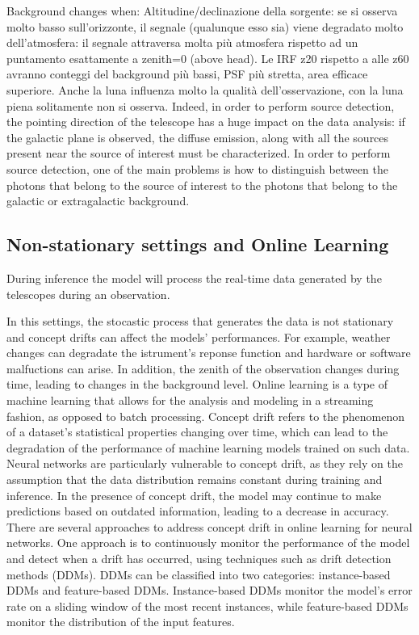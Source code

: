 Background changes when: Altitudine/declinazione della sorgente: se si osserva molto basso sull'orizzonte, il segnale (qualunque esso sia) viene degradato molto dell'atmosfera: il segnale attraversa molta più atmosfera rispetto ad un puntamento esattamente a zenith=0 (above head). Le IRF z20 rispetto a alle z60 avranno conteggi del background più bassi, PSF più stretta, area efficace superiore. Anche la luna influenza molto la qualità dell’osservazione, con la luna piena solitamente non si osserva. 
Indeed, in order to perform source detection, the pointing direction of the telescope has a huge impact on the data analysis: if the galactic plane is observed, the diffuse emission, along with all the sources present near the source of interest must be characterized. 
In order to perform source detection, one of the main problems is how to distinguish between the photons that belong to the source of interest to the photons that belong to the galactic or extragalactic background.



\subsection{Non-stationary settings and Online Learning}
\label{s:non-stationary-settings}
During inference the model will process the real-time data generated by the telescopes during an observation. 

In this settings, the stocastic process that generates the data
is not stationary and concept drifts can affect the models' performances. For example, weather changes can degradate the istrument's reponse function and hardware or software malfuctions can arise. In addition, the zenith of the observation changes during time, leading to changes in the background level.  Online learning is a type of machine learning that allows for the analysis and modeling in a streaming fashion, as opposed to batch processing. Concept drift refers to the phenomenon of a dataset's statistical properties changing over time, which can lead to the degradation of the performance of machine learning models trained on such data.
Neural networks are particularly vulnerable to concept drift, as they rely on the assumption that the data distribution remains constant during training and inference. In the presence of concept drift, the model may continue to make predictions based on outdated information, leading to a decrease in accuracy. There are several approaches to address concept drift in online learning for neural networks. One approach is to continuously monitor the performance of the model and detect when a drift has occurred, using techniques such as drift detection methods (DDMs). DDMs can be classified into two categories: instance-based DDMs and feature-based DDMs. Instance-based DDMs monitor the model's error rate on a sliding window of the most recent instances, while feature-based DDMs monitor the distribution of the input features.

